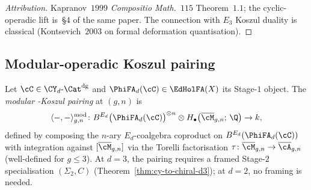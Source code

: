 \begin{proof}[Attribution]
Kapranov~$1999$ \emph{Compositio Math.}\ $115$ Theorem~$1.1$; the
cyclic-operadic lift is~\S$4$ of the same paper. The connection with
$E_3$ Koszul duality is classical (Kontsevich~$2003$ on formal
deformation quantisation).
\end{proof}

\subsection{Modular-operadic Koszul pairing}

\begin{definition}
\label{def:modular-koszul-pairing-chapter}
Let $\cC \in \CY_d\text{-}\Cat^{\mathrm{dg}}$ and
$\PhiFA_d(\cC) \in \EdHolFA(X)$ its Stage-$1$ object. The \emph{modular
-Koszul pairing} at $(g, n)$ is
\begin{equation}
\label{eq:modular-koszul-pairing-chapter}
 \langle -, - \rangle^{\mathrm{mod}}_{g, n} \colon
 B^{E_d}\bigl(\PhiFA_d(\cC)\bigr)^{\otimes n} \otimes
 H_\bullet\bigl(\overline{\cM}_{g, n};\, \Q\bigr) \to k,
\end{equation}
defined by composing the $n$-ary $E_d$-coalgebra coproduct on
$B^{E_d}(\PhiFA_d(\cC))$ with integration against
$[\overline{\cM}_{g, n}]$ via the Torelli factorisation
$\tau \colon \overline{\cM}_{g, n} \to \overline{\cA}_{g, n}$
(well-defined for $g \leq 3$). At $d = 3$, the pairing requires a
framed Stage-$2$ specialisation
$(\Sigma_2, C)$ (Theorem~\ref{thm:cy-to-chiral-d3}); at $d = 2$, no
framing is needed.
\end{definition}

